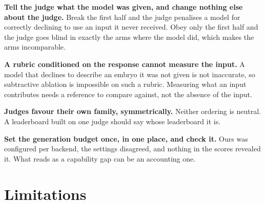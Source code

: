 \documentclass[11pt]{article}
\begin{document}
\textbf{Tell the judge what the model was given, and change nothing else about
the judge.} Break the first half and the judge penalises a model for correctly
declining to use an input it never received. Obey only the first half and the
judge goes blind in exactly the arms where the model did, which makes the arms
incomparable.

\textbf{A rubric conditioned on the response cannot measure the input.} A model
that declines to describe an embryo it was not given is not inaccurate, so
subtractive ablation is impossible on such a rubric. Measuring what an input
contributes needs a reference to compare against, not the absence of the input.

\textbf{Judges favour their own family, symmetrically.} Neither ordering is
neutral. A leaderboard built on one judge should say whose leaderboard it is.

\textbf{Set the generation budget once, in one place, and check it.} Ours was
configured per backend, the settings disagreed, and nothing in the scores
revealed it. What reads as a capability gap can be an accounting one.


\section{Limitations}
\label{sec:limitations}
\end{document}
